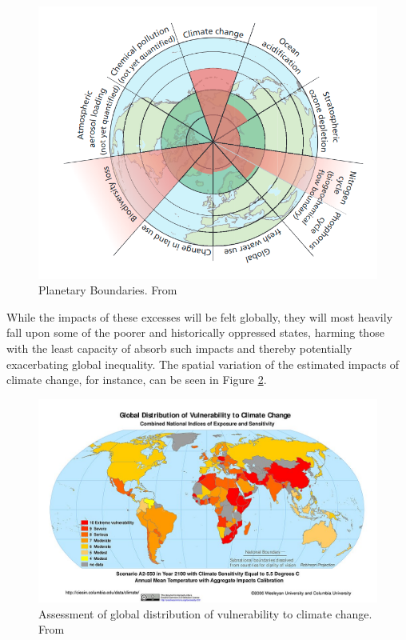 \begin{figure}[!htb]
	\centering
	\includegraphics[scale=0.4]{Figures/chap2/Planetary_Boundaries.png}
	\caption[Planetary Boundaries]{Planetary Boundaries. From \cite{rockstromSafeOperatingSpace2009}}
	\label{fig:boundaries}
\end{figure}

While the impacts of these excesses will be felt globally, they will most heavily fall upon some of the poorer and historically oppressed states, harming those with the least capacity of absorb such impacts and thereby potentially exacerbating global inequality. The spatial variation of the estimated impacts of climate change, for instance, can be seen in Figure \ref{fig:vulnerability}.

\begin{figure}[!htb]
	\centering
	\includegraphics[scale=1.7]{Figures/chap2/vulnerability_map.jpg}
	\caption[Assessment of global distribution of vulnerability to climate change]{Assessment of global distribution of vulnerability to climate change. From \cite{yoheSyntheticAssessmentGlobal2006}}
	\label{fig:vulnerability}
\end{figure}

